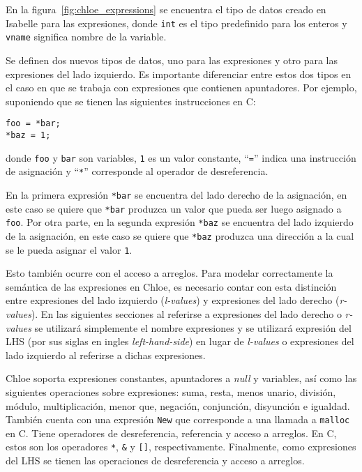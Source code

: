 En la figura~\ref{fig:chloe_expressions} se encuentra el tipo de datos creado en Isabelle para las expresiones, donde \verb|int| es el tipo predefinido para los enteros y \verb|vname| significa nombre de la variable.

Se definen dos nuevos tipos de datos, uno para las expresiones y otro para las expresiones del lado izquierdo.
Es importante diferenciar entre estos dos tipos en el caso en que se trabaja con expresiones que contienen apuntadores.
Por ejemplo, suponiendo que se tienen las siguientes instrucciones en C:

\begin{lstlisting}[mathescape=true, frame=single]
foo = *bar;
*baz = 1;
\end{lstlisting}

donde \verb|foo| y \verb|bar| son variables, \verb|1| es un valor constante, ``\verb|=|'' indica una instrucción de asignación y ``\verb|*|'' corresponde al operador de desreferencia.

En la primera expresión \verb|*bar| se encuentra del lado derecho de la asignación, en este caso se quiere que \verb|*bar| produzca un valor que pueda ser luego asignado a \verb|foo|.
Por otra parte, en la segunda expresión \verb|*baz| se encuentra del lado izquierdo de la asignación, en este caso se quiere que \verb|*baz| produzca una dirección a la cual se le pueda asignar el valor \verb|1|.

Esto también ocurre con el acceso a arreglos.
Para modelar correctamente la semántica de las expresiones en Chloe, es necesario contar con esta distinción entre expresiones del lado izquierdo (\textit{l-values}) y expresiones del lado derecho (\textit{r-values}).
En las siguientes secciones al referirse a expresiones del lado derecho o \textit{r-values} se utilizará simplemente el nombre expresiones y se utilizará expresión del LHS (por sus siglas en ingles \textit{left-hand-side}) en lugar de \textit{l-values} o expresiones del lado izquierdo al referirse a dichas expresiones.
\begin{comment}
FIXME mosca! esto está mal traducido!
\end{comment}

Chloe soporta expresiones constantes, apuntadores a \textit{null} y variables, así como las siguientes operaciones sobre expresiones: suma, resta, menos unario, división, módulo, multiplicación, menor que, negación, conjunción, disyunción e igualdad.
También cuenta con una expresión \verb|New| que corresponde a una llamada a \verb|malloc| en C.
Tiene operadores de desreferencia, referencia y acceso a arreglos.
En C, estos son los operadores \verb|*|, \verb|&| y \verb|[]|, respectivamente.
Finalmente, como expresiones del LHS se tienen las operaciones de desreferencia y acceso a arreglos.
\begin{comment}
FIXME mosca! esto está mal traducido!
\end{comment}

